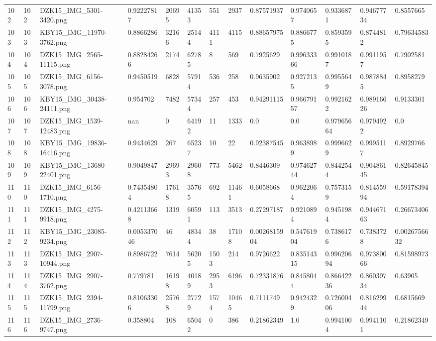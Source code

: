\documentclass[11pt, a4paper, twoside]{report}
\begin{document}
\begin{longtable}[c]{@{}lllllllllllll@{}}
102 & 102 & DZK15\_IMG\_5301-3420.png & 0.92227817 & 20695 & 41353 & 551 & 2937 & 0.87571937 & 0.9740657 & 0.9336871 & 0.94677734 & 0.8557665 \\
103 & 103 & KBY15\_IMG\_11970-3762.png & 0.8866286 & 32166 & 25144 & 4111 & 4115 & 0.88657975 & 0.8866775 & 0.8593595 & 0.8744812 & 0.79634583 \\
104 & 104 & DZK15\_IMG\_2565-11115.png & 0.88284266 & 2174 & 62785 & 8 & 569 & 0.7925629 & 0.99633366 & 0.9910187 & 0.9911957 & 0.7902581 \\
105 & 105 & DZK15\_IMG\_6156-3078.png & 0.9450519 & 6828 & 57914 & 536 & 258 & 0.9635902 & 0.9272135 & 0.9955649 & 0.9878845 & 0.8958279 \\
106 & 106 & KBY15\_IMG\_30438-24111.png & 0.954702 & 7482 & 57344 & 257 & 453 & 0.94291115 & 0.96679157 & 0.9921622 & 0.98916626 & 0.9133301 \\
107 & 107 & DZK15\_IMG\_1539-12483.png & nan & 0 & 64192 & 11 & 1333 & 0.0 & 0.0 & 0.97965664 & 0.9794922 & 0.0 \\
108 & 108 & KBY15\_IMG\_19836-16416.png & 0.9434629 & 267 & 65237 & 10 & 22 & 0.92387545 & 0.9638989 & 0.9996629 & 0.9995117 & 0.8929766 \\
109 & 109 & KBY15\_IMG\_13680-22401.png & 0.9049847 & 29693 & 29608 & 773 & 5462 & 0.8446309 & 0.97462744 & 0.8442544 & 0.90486145 & 0.82645845 \\
110 & 110 & DZK15\_IMG\_6156-1710.png & 0.74354804 & 17618 & 35765 & 692 & 11461 & 0.6058668 & 0.9622064 & 0.7573159 & 0.81455994 & 0.59178394 \\
111 & 111 & DZK15\_IMG\_4275-9918.png & 0.42113668 & 1319 & 60591 & 113 & 3513 & 0.27297187 & 0.9210894 & 0.9451984 & 0.94467163 & 0.26673406 \\
112 & 112 & KBY15\_IMG\_23085-9234.png & 0.005337046 & 46 & 48344 & 38 & 17108 & 0.0026815904 & 0.54761904 & 0.7386176 & 0.7383728 & 0.0026756632 \\
113 & 113 & DZK15\_IMG\_2907-10944.png & 0.8986722 & 7614 & 56205 & 1503 & 214 & 0.9726622 & 0.83514315 & 0.99620694 & 0.97380066 & 0.81598973 \\
114 & 114 & DZK15\_IMG\_2907-3762.png & 0.779781 & 16198 & 40189 & 2953 & 6196 & 0.72331876 & 0.8458044 & 0.86642236 & 0.86039734 & 0.63905 \\
115 & 115 & DZK15\_IMG\_2394-11799.png & 0.81063306 & 25768 & 27729 & 1574 & 10465 & 0.7111749 & 0.9424329 & 0.72600406 & 0.81629944 & 0.6815669 \\
116 & 116 & DZK15\_IMG\_2736-9747.png & 0.358804 & 108 & 65042 & 0 & 386 & 0.21862349 & 1.0 & 0.9941004 & 0.9941101 & 0.21862349 \\

\end{longtable}
\end{document}

